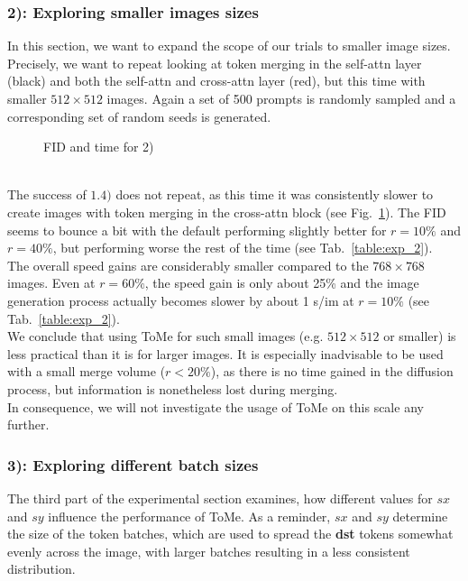 \subsubsection*{2): Exploring smaller images sizes}
In this section, we want to expand the scope of our trials to smaller image sizes. Precisely, we want to repeat looking at token merging in the self-attn layer (black) and both the self-attn and cross-attn layer (red), but this time with smaller $512 \times 512$ images. Again a set of 500 prompts is randomly sampled and a corresponding set of random seeds is generated.
\begin{figure}[!htb]
    
    
\caption{FID and time for 2)}
\label{fig:exp_2}
\end{figure}\\
The success of \(1.4)\) does not repeat, as this time it was consistently slower to create images with token merging in the cross-attn block (see Fig.~\ref{fig:exp_2}). The FID seems to bounce a bit with the default performing slightly better for \(r=10\%\) and \(r=40\%\), but performing worse the rest of the time (see Tab.~\ref{table:exp_2}). \\
The overall speed gains are considerably smaller compared to the \(768 \times 768\) images. Even at \(r=60\%\), the speed gain is only about 25\% and the image generation process actually becomes slower by about 1 s/im at \(r=10\%\) (see Tab.~\ref{table:exp_2}).\\
We conclude that using ToMe for such small images (e.g. $512 \times 512$ or smaller) is less practical than it is for larger images. It is especially inadvisable to be used with a small merge volume (\(r<20\%\)), as there is no time gained in the diffusion process, but information is nonetheless lost during merging. \\
In consequence, we will not investigate the usage of ToMe on this scale any further.



\subsubsection*{3): Exploring different batch sizes}
The third part of the experimental section examines, how different values for \(sx\) and \(sy\) influence the performance of ToMe. As a reminder, \(sx\) and \(sy\) determine the size of the token batches, which are used to spread the \textbf{dst} tokens somewhat evenly across the image, with larger batches resulting in a less consistent distribution.



